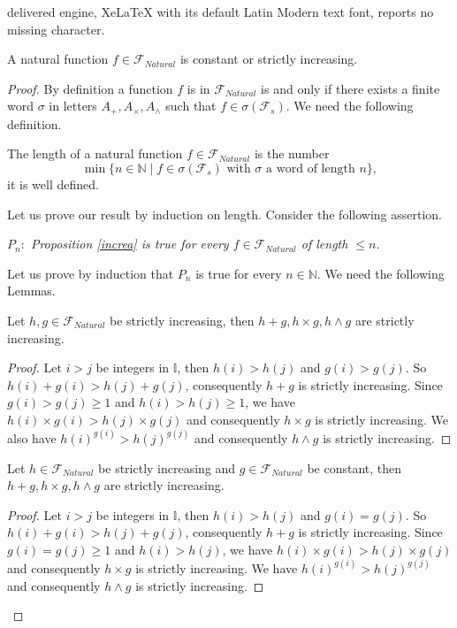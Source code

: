 \documentclass[10pt,a4paper]{amsart}
\newcommand{\I}{\mathbb{I}}
\newcommand{\N}{\mathbb{N}}
\renewcommand{\geq}{\geqslant}
\renewcommand{\leq}{\leqslant}
\begin{document}
delivered engine, XeLaTeX with its default Latin Modern text font, reports no missing character.
\begin{prop} \label{increa} A natural function $f \in \mathscr{F} _{Natural}$ is constant or strictly increasing.

\end{prop}

\begin{proof} By definition a function $f $ is in $\mathscr{F} _{Natural}$ is and only if there exists a finite word $\sigma$ in letters $A_+ , A_{\times} , A_{\wedge}$ such that $f \in \sigma (\mathscr{F} _s )$.  We need the following definition.

\begin{defi} The length of a natural function $f \in \mathscr{F}_{Natural}$ is the number \[ \min \{n \in \N \mid  f \in \sigma (\mathscr{F}_s) \text{ with $\sigma$ a word of length $n$} \}, \] it is well defined.

\end{defi} Let us prove our result by induction on length. Consider the following assertion.
\begin{center}

 \textit{$P_n :$ Proposition \ref{increa} is true for every $f \in \mathscr{F}_{Natural}$ of length $\leq n$.}
\end{center}
 
 Let us prove by induction that $P_n$ is true for every $n \in \N$. We need the following Lemmas.
 
  \begin{lemm} \label{lem0} Let $h,g \in \mathscr{F}_{Natural}$ be strictly increasing, then $h+g , h\times g , h \wedge g  $ are strictly increasing.
\end{lemm} 
\begin{proof}
Let $i>j$ be integers in $\I$, then $h(i)>h(j)$ and $g(i)> g (j)$. So $h(i)+g(i) > h(j)+g(j)$, consequently $h+g$ is strictly increasing. Since $ g(i) > g(j) \geq 1 $ and $h(i) > h(j) \geq 1$, we have $h(i)\times g(i) > h(j)\times g(j)$ and consequently $h\times g $ is strictly increasing. We also have $h(i)^{g(i)} > h(j) ^{g(j)}$ and consequently $h \wedge g$ is strictly increasing.
\end{proof} 
 
  \begin{lemm} \label{lem1} Let $h \in \mathscr{F}_{Natural}$ be strictly increasing and $g  \in \mathscr{F} _{Natural}$ be constant, then $h+g , h\times g , h \wedge g  $ are strictly increasing.
\end{lemm} 
\begin{proof}
Let $i>j$ be integers in $\I$, then $h(i)>h(j)$ and $g(i)= g (j)$. So $h(i)+g(i) > h(j)+g(j)$, consequently $h+g$ is strictly increasing. Since $g(i) = g(j) \geq 1$ and $h(i) > h(j)$, we have $h(i)\times g(i) > h(j)\times g(j)$ and consequently $h\times g $ is strictly increasing. We have $h(i)^{g(i)} > h(j) ^{g(j)}$ and consequently $h \wedge g$ is strictly increasing.
\end{proof} 


\end{proof}
\end{document}
